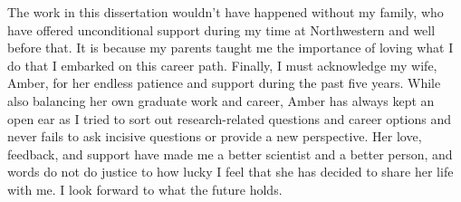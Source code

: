 \documentclass[12pt]{nuthesis}	%
\begin{document}
The work in this dissertation wouldn't have happened without my family, who have offered unconditional support during my time at Northwestern and well before that. It is because my parents taught me the importance of loving what I do that I embarked on this career path. Finally, I must acknowledge my wife, Amber, for her endless patience and support during the past five years. While also balancing her own graduate work and career, Amber has always kept an open ear as I tried to sort out research-related questions and career options and never fails to ask incisive questions or provide a new perspective. Her love, feedback, and support have made me a better scientist and a better person, and words do not do justice to how lucky I feel that she has decided to share her life with me. I look forward to what the future holds.





%
%
%
%
%
%
%
%

\clearpage{} %
\tableofcontents	%

\clearpage{} %
\listoftables		%

\clearpage{} %
\listoffigures		%



\mainmatter             %











\end{document}

